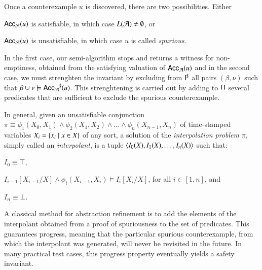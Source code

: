 \documentclass{llncs}
\begin{document}
Once a counterexample $u$ is discovered, there are two
possibilities. Either\begin{inparaenum}[(i)]
\item $\mathsf{Acc}_{\mathcal{A}}(u)$ is satisfiable, in which case $L(\mathcal{A}) \neq \emptyset$, or
\item $\mathsf{Acc}_{\mathcal{A}}(u)$ is unsatisfiable, in which case $u$ is called
  \emph{spurious}.
\end{inparaenum}
In the first case, our semi-algorithm stops and returns a witness for
non-emptiness, obtained from the satisfying valuation of
$\mathsf{Acc}_{\mathcal{A}}(u)$ and in the second case, we must strenghten the
invariant by excluding from ${\mathsf{I}}^\sharp$ all pairs $(\beta,\nu)$ such
that $\beta\cup\nu \models {\mathsf{Acc}_{\mathcal{A}}}^\sharp(u)$. This strenghtening
is carried out by adding to $\mathsf{\Pi}$ several predicates that are
sufficient to exclude the spurious counterexample.

In general, given an unsatisfiable conjunction $\pi \equiv
\phi_1(X_0,X_1) \wedge \phi_2(X_1,X_2) \wedge \ldots \wedge
\phi_n(X_{n-1},X_n)$ of time-stamped variables $X_i = \left\{ x_i \mid x
  \in X \right\}$ of any sort, a solution of the \emph{interpolation problem}
$\pi$, simply called an \emph{interpolant}, is a tuple $\left\langle I_0(X),
  I_1(X), \ldots, I_n(X) \right\rangle$ such that:\begin{inparaenum}[(i)]
\item $I_0 \equiv \top$,  
%
\item $I_{i-1}[X_{i-1}/X] \wedge \phi_i(X_{i-1},X_i) \models
  I_i[X_i/X]$, for all $i \in [1,n]$, and
%
\item $I_n \equiv \bot$. 
\end{inparaenum}
A classical method for abstraction refinement is to add the elements
of the interpolant obtained from a proof of spuriousness to the set of
predicates. This guarantees progress, meaning that the particular
spurious counterexample, from which the interpolant was generated,
will never be revisited in the future. In many practical test cases,
this progress property eventually yields a safety invariant. 
\end{document}

